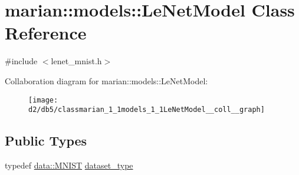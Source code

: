 \hypertarget{classmarian_1_1models_1_1LeNetModel}{}\section{marian\+:\+:models\+:\+:Le\+Net\+Model Class Reference}
\label{classmarian_1_1models_1_1LeNetModel}


{\ttfamily \#include $<$lenet\+\_\+mnist.\+h$>$}



Collaboration diagram for marian\+:\+:models\+:\+:Le\+Net\+Model\+:
\nopagebreak
\begin{figure}[H]
\begin{center}
\leavevmode
\texttt{[image: d2/db5/classmarian\_1\_1models\_1\_1LeNetModel\_\_coll\_\_graph]}
\end{center}
\end{figure}
\subsection*{Public Types}
\begin{DoxyCompactItemize}
\item 
typedef \hyperlink{classmarian_1_1data_1_1MNIST}{data\+::\+M\+N\+I\+ST} \hyperlink{classmarian_1_1models_1_1LeNetModel_a3ea0650decc088dcc46d7f687ca7171a}{dataset\+\_\+type}
\end{DoxyCompactItemize}
